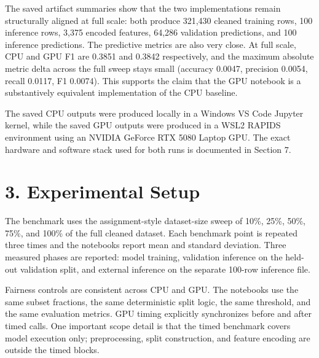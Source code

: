 \documentclass[10pt]{article}
\begin{document}
The saved artifact summaries show that the two implementations remain structurally aligned at full scale: both produce 321,430 cleaned training rows, 100 inference rows, 3,375 encoded features, 64,286 validation predictions, and 100 inference predictions. The predictive metrics are also very close. At full scale, CPU and GPU F1 are 0.3851 and 0.3842 respectively, and the maximum absolute metric delta across the full sweep stays small (accuracy 0.0047, precision 0.0054, recall 0.0117, F1 0.0074). This supports the claim that the GPU notebook is a substantively equivalent implementation of the CPU baseline.

The saved CPU outputs were produced locally in a Windows VS Code Jupyter kernel, while the saved GPU outputs were produced in a WSL2 RAPIDS environment using an NVIDIA GeForce RTX 5080 Laptop GPU. The exact hardware and software stack used for both runs is documented in Section 7.

\section*{3. Experimental Setup}
The benchmark uses the assignment-style dataset-size sweep of 10\%, 25\%, 50\%, 75\%, and 100\% of the full cleaned dataset. Each benchmark point is repeated three times and the notebooks report mean and standard deviation. Three measured phases are reported: model training, validation inference on the held-out validation split, and external inference on the separate 100-row inference file.

Fairness controls are consistent across CPU and GPU. The notebooks use the same subset fractions, the same deterministic split logic, the same threshold, and the same evaluation metrics. GPU timing explicitly synchronizes before and after timed calls. One important scope detail is that the timed benchmark covers model execution only; preprocessing, split construction, and feature encoding are outside the timed blocks.
\end{document}
